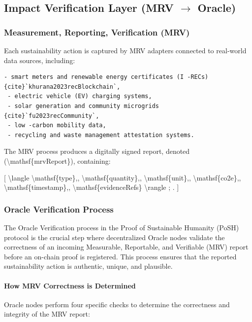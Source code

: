\documentclass{article}
\begin{document}
\subsection{Impact Verification Layer (MRV $\rightarrow$ Oracle)}

\subsubsection{Measurement, Reporting, Verification (MRV)}

Each sustainability action is captured by MRV adapters connected to real-world
data sources, including:

\begin{verbatim}
- smart meters and renewable energy certificates (I -RECs) {cite}`khurana2023recBlockchain`,
 - electric vehicle (EV) charging systems,
 - solar generation and community microgrids {cite}`fu2023recCommunity`,
 - low -carbon mobility data,
 - recycling and waste management attestation systems.
\end{verbatim}

The MRV process produces a digitally signed report, denoted
({\textbackslash}mathsf\{mrvReport\}), containing:

[
{\textbackslash}langle {\textbackslash}mathsf\{type\},, {\textbackslash}mathsf\{quantity\},, {\textbackslash}mathsf\{unit\},, {\textbackslash}mathsf\{co2e\},,
{\textbackslash}mathsf\{timestamp\},, {\textbackslash}mathsf\{evidenceRefs\} {\textbackslash}rangle ; .
]

\subsubsection{Oracle Verification Process}

The Oracle Verification process in the Proof of Sustainable Humanity (PoSH) protocol is the crucial step where decentralized Oracle nodes validate the correctness of an incoming Measurable, Reportable, and Verifiable (MRV) report before an on-chain proof is registered. This process ensures that the reported sustainability action is authentic, unique, and plausible.

\paragraph{How MRV Correctness is Determined}

Oracle nodes perform four specific checks to determine the correctness and integrity of the MRV report:
\end{document}
